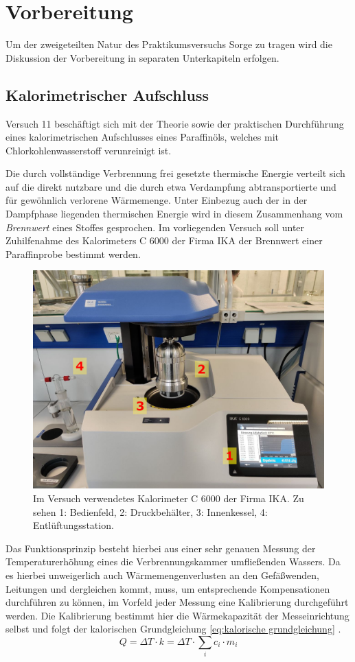 \chapter{Vorbereitung}
	Um der zweigeteilten Natur des Praktikumsversuchs Sorge zu tragen wird die Diskussion der Vorbereitung in separaten Unterkapiteln
	erfolgen.
	\section{Kalorimetrischer Aufschluss}\label{sec:vorbereitung kalorimetrischer aufschluss}
		Versuch 11 beschäftigt sich mit der Theorie sowie der praktischen Durchführung eines kalorimetrischen Aufschlusses
		eines Paraffinöls, welches mit Chlorkohlenwasserstoff verunreinigt ist.\par
		Die durch vollständige Verbrennung frei gesetzte thermische Energie verteilt sich auf die direkt nutzbare und die durch
		etwa Verdampfung abtransportierte und für gewöhnlich verlorene Wärmemenge. Unter Einbezug auch der in der Dampfphase liegenden
		thermischen Energie wird in diesem Zusammenhang vom \textit{Brennwert} eines Stoffes gesprochen.
		Im vorliegenden Versuch soll unter Zuhilfenahme des Kalorimeters C 6000 der Firma \textsc{IKA} der Brennwert einer Paraffinprobe
		bestimmt werden.
		\begin{figure}[h]
			\centering
			\includegraphics[width=.7\textwidth]{assets/photos/kaloriemeter_aufbau_edit.jpg}
			\caption[Im Versuch verwendetes Kalorimeter]{Im Versuch verwendetes Kalorimeter C 6000 der Firma \textsc{IKA}. Zu sehen 1: Bedienfeld, 2: Druckbehälter, 3: Innenkessel, 4: Entlüftungsstation.}
			\label{fig:kalorimeter aufbau}
		\end{figure}
		Das Funktionsprinzip besteht hierbei aus einer sehr genauen Messung der Temperaturerhöhung eines die Verbrennungskammer umfließenden
		Wassers. Da es hierbei unweigerlich auch Wärmemengenverlusten an den Gefäßwenden, Leitungen und dergleichen kommt, muss,
		um entsprechende Kompensationen durchführen zu können, im Vorfeld jeder Messung eine Kalibrierung durchgeführt werden.
		Die Kalibrierung bestimmt hier die Wärmekapazität der Messeinrichtung selbst und folgt der kalorischen Grundgleichung \cref{eq:kalorische grundgleichung} \cite{Einstieg.in.die.Physikalische.Chemie.fuer.Nebenfaechler.Bechmann.2016}.
		\begin{equation}
			Q = \Delta T \cdot k = \Delta T \cdot \sum_i c_i \cdot m_i
			\label{eq:kalorische grundgleichung}
		\end{equation}

